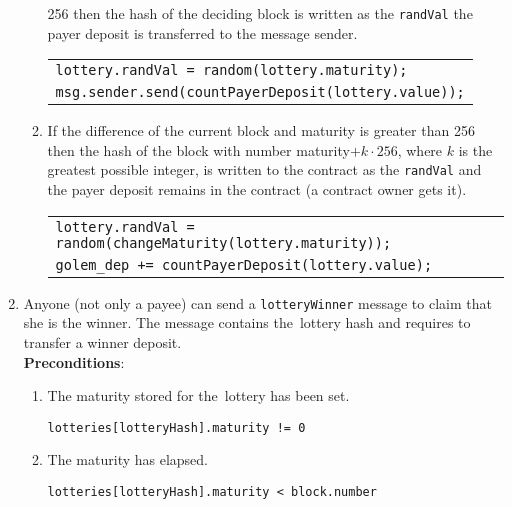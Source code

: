 \documentclass[a4paper]{article}
\begin{document}
\begin{enumerate}
\begin{enumerate}
                256 then  the hash of the deciding block is written as the \texttt{randVal} the payer deposit is
                transferred to the message sender.
                \begin{center}
                    \begin{tabular}{l}
                        \texttt{lottery.randVal = random(lottery.maturity);}\\
                        \texttt{msg.sender.send(countPayerDeposit(lottery.value));}
                    \end{tabular}
                \end{center}
            \item If the difference of the current block and maturity is greater than 256 then the hash of the block
            with number maturity$+k \cdot 256$, where $k$ is the greatest possible integer, is written to the contract
            as the \texttt{randVal} and the payer deposit remains in the contract (a contract owner gets it).
            \begin{center}
                \begin{tabular}{l}
                    \texttt{lottery.randVal = random(changeMaturity(lottery.maturity));}\\
		            \texttt{golem\_dep += countPayerDeposit(lottery.value);}
		        \end{tabular}
		    \end{center}
        \end{enumerate}
        \item Anyone (not only a payee) can send a \texttt{lotteryWinner} message to claim that she is the winner.
            The message contains the~lottery hash and requires to transfer a winner deposit.\\
            \textbf{Preconditions}:
            \begin{enumerate}
                \item The maturity stored for the~lottery has been set.
                    \begin{center}
                        \texttt{lotteries[lotteryHash].maturity != 0}
                    \end{center}
                \item The maturity has elapsed.
                    \begin{center}
		                \texttt{lotteries[lotteryHash].maturity < block.number}
		            \end{center}

\end{enumerate}
\end{enumerate}
\end{document}
